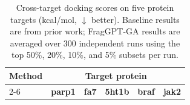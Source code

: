\documentclass[lettersize,journal]{IEEEtran}
\begin{document}
\begin{table}[t]
    \caption{Cross-target docking scores on five protein targets (kcal/mol, \(\downarrow\) better). Baseline results are from prior work; FragGPT-GA results are averaged over 300 independent runs using the top 50\%, 20\%, 10\%, and 5\% subsets per run.}
    \label{tab:target_protein_scores}
    \centering
    \small %

    \begin{tabular}{l ccccc}
        \hline
        \textbf{Method} & \multicolumn{5}{c}{\textbf{Target protein}} \\ 
        \cline{2-6} %

        & \textbf{parp1} & \textbf{fa7} & \textbf{5ht1b} & \textbf{braf} & \textbf{jak2} \\
        \hline
        

\end{tabular}
\end{table}
\end{document}
